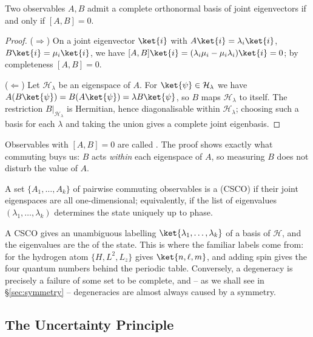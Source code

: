 \begin{theorem}[Compatibility]
    Two observables $A, B$ admit a complete orthonormal basis of joint eigenvectors if and only if $[A,B] = 0$.
\end{theorem}
\begin{proof}
    ($\Rightarrow$) On a joint eigenvector $\ket{i}$ with $A\ket{i} = \lambda_i\ket{i}$, $B\ket{i} = \mu_i\ket{i}$, we have $[A,B]\ket{i} = (\lambda_i\mu_i - \mu_i\lambda_i)\ket{i} = 0$; by completeness $[A,B] = 0$.

    ($\Leftarrow$) Let $\mathcal{H}_\lambda$ be an eigenspace of $A$. For $\ket{\psi} \in \mathcal{H}_\lambda$ we have $A(B\ket{\psi}) = B(A\ket{\psi}) = \lambda B\ket{\psi}$, so $B$ maps $\mathcal{H}_\lambda$ to itself. The restriction $B|_{\mathcal{H}_\lambda}$ is Hermitian, hence diagonalisable within $\mathcal{H}_\lambda$; choosing such a basis for each $\lambda$ and taking the union gives a complete joint eigenbasis.
\end{proof}

Observables with $[A,B] = 0$ are called . The proof shows exactly what commuting buys us: $B$ acts \emph{within} each eigenspace of $A$, so measuring $B$ does not disturb the value of $A$.

\begin{definition}
    A set $\{A_1, \dots, A_k\}$ of pairwise commuting observables is a  (CSCO) if their joint eigenspaces are all one-dimensional; equivalently, if the list of eigenvalues $(\lambda_1, \dots, \lambda_k)$ determines the state uniquely up to phase.
\end{definition}

A CSCO gives an unambiguous labelling $\ket{\lambda_1, \dots, \lambda_k}$ of a basis of $\mathcal{H}$, and the eigenvalues are the  of the state. This is where the familiar labels come from: for the hydrogen atom $\{H, L^2, L_z\}$ gives $\ket{n, \ell, m}$, and adding spin gives the four quantum numbers behind the periodic table. Conversely, a degeneracy is precisely a failure of some set to be complete, and -- as we shall see in \S\ref{sec:symmetry} -- degeneracies are almost always caused by a symmetry.

\subsection{The Uncertainty Principle}

